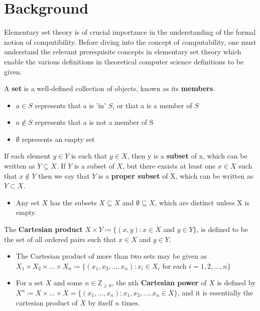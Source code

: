 \documentclass{article}
\begin{document}
\section{Background}
Elementary set theory is of crucial importance in the understanding of the formal notion of computibility. Before diving into the concept of computability, one must understand the relevant prerequisite concepts in elementary set theory which enable the various definitions in theoretical computer science definitions to be given.
\begin{defin}
A \textbf{set} is a well-defined collection of objects, known as its \textbf{members}.
\begin{itemize}
\item $a \in S$ represents that a is 'in' $S$, or that a is a member of $S$
\item $a \notin S$ represents that a is not a member of S
\item $\emptyset$ represents an empty set
\end{itemize}
\end{defin}
\begin{defin}
If each element $y \in Y$ is such that $y \in X$, then y is a \textbf{subset} of x, which can be written as $Y\subseteq X$.
If $Y$ is a subset of $X$, but there exsists at least one $x \in X$ such that $x \notin Y$ then we say that $Y$ is a \textbf{proper subset} of X, which can be written as $Y \subset X$.
\begin{itemize}
\item Any set $X$ has the subsets $X \subseteq X$ and $\emptyset \subseteq X$, which are distinct unless X is empty.
\end{itemize}
\end{defin}
\begin{defin}
The \textbf{Cartesian product} $X \times Y \coloneq \{ (x, y): x \in X$ and $y \in Y \}$, is defined to be the set of all ordered pairs such that $x \in X$ and $y \in Y$.
\begin{itemize}
\item The Cartesian product of more than two sets may be given as
$X_{1}\times X_{2} \times {...} \times X_{n} \coloneq \{( x_{1},x_{2},{...},x_{n}):x_{i}\in X_{i}$ for each $i = 1,2,{...},n\}$
\item For a set $X$ and some $n \in \mathbb{Z}_{\geq 0}$, the nth \textbf{Cartesian power} of $X$ is defined by
$X^{n} \coloneq X \times {...} \times X = \{(x_{1},{...},x_n) ; x_{1},x_{2},{...},x_{n}\in X\}$, and it is essentially the cartesian product of $X$ by itself $n$ times.
\end{itemize}
\end{defin}
\end{document}
